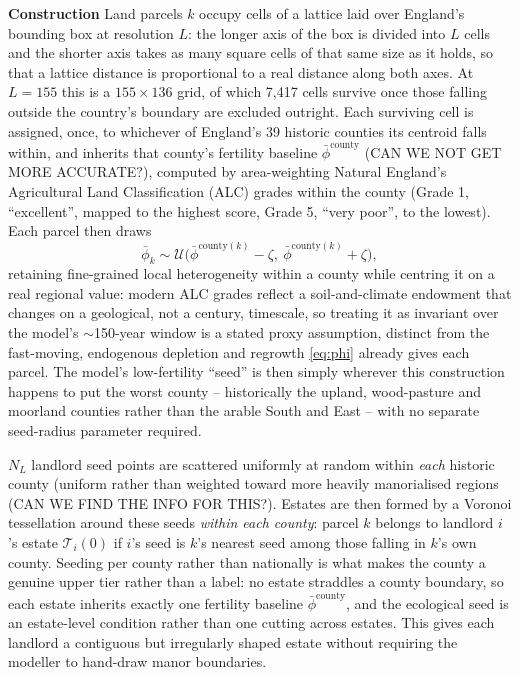 \documentclass[11pt,english]{article}
\begin{document}
\textbf{Construction} Land parcels $k$ occupy cells of a lattice laid over England's bounding box at resolution $L$: the longer axis of the box is divided into $L$ cells and the shorter axis takes as many square cells of that same size as it holds, so that a lattice distance is proportional to a real distance along both axes. At $L=155$ this is a $155\times136$ grid, of which 7,417 cells survive once those falling outside the country's boundary \cite{ons2022boundaries} are excluded outright. Each surviving cell is assigned, once, to whichever of England's 39 historic counties its centroid falls within, and inherits that county's fertility baseline $\bar\phi^{\text{county}}$ (CAN WE NOT GET MORE ACCURATE?), computed by area-weighting Natural England's Agricultural Land Classification (ALC) grades \cite{naturalengland2021alc} within the county (Grade 1, ``excellent'', mapped to the highest score, Grade 5, ``very poor'', to the lowest). Each parcel then draws
\begin{equation}
\bar\phi_k \sim \mathcal{U}\big(\bar\phi^{\text{county}(k)} - \zeta,\ \bar\phi^{\text{county}(k)} + \zeta\big),
\end{equation}
retaining fine-grained local heterogeneity within a county while centring it on a real regional value: modern ALC grades reflect a soil-and-climate endowment that changes on a geological, not a century, timescale, so treating it as invariant over the model's $\sim$150-year window is a stated proxy assumption, distinct from the fast-moving, endogenous depletion and regrowth \eqref{eq:phi} already gives each parcel. The model's low-fertility ``seed'' is then simply wherever this construction happens to put the worst county -- historically the upland, wood-pasture and moorland counties rather than the arable South and East -- with no separate seed-radius parameter required.

$N_L$ landlord seed points are scattered uniformly at random within \emph{each} historic county (uniform rather than weighted toward more heavily manorialised regions (CAN WE FIND THE INFO FOR THIS?). Estates are then formed by a Voronoi tessellation around these seeds \emph{within each county}: parcel $k$ belongs to landlord $i$'s estate $\mathcal{T}_i(0)$ if $i$'s seed is $k$'s nearest seed among those falling in $k$'s own county. Seeding per county rather than nationally is what makes the county a genuine upper tier rather than a label: no estate straddles a county boundary, so each estate inherits exactly one fertility baseline $\bar\phi^{\text{county}}$, and the ecological seed is an estate-level condition rather than one cutting across estates. This gives each landlord a contiguous but irregularly shaped estate without requiring the modeller to hand-draw manor boundaries.
\end{document}
